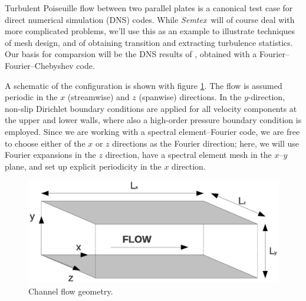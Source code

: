 \documentclass[11pt,a4paper]{report}
\newcommand{\Semtex}{\emph{Semtex}}
\begin{document}
Turbulent Poiseuille flow between two parallel plates is a canonical
test case for direct numerical simulation (DNS) codes.  While
\Semtex\ will of course deal with more complicated problems, we'll use
this as an example to illustrate techniques of mesh design, and of
obtaining transition and extracting turbulence statistics.  Our basis
for comparsion will be the DNS results of \citet*{kmm87}, obtained
with a Fourier--Fourier--Chebyshev code.

A schematic of the configuration is shown with figure
\ref{pic:configuration}. The flow is assumed periodic in the $x$
(streamwise) and $z$ (spanwise) directions.  In the $y$-direction,
non-slip Dirichlet boundary conditions are applied for all velocity
components at the upper and lower walls, where also a high-order
pressure boundary condition \citep[of computed Neumann type,
  see][]{kio91} is employed. Since we are working with a spectral
element--Fourier code, we are free to choose either of the $x$ or $z$
directions as the Fourier direction; here, we will use Fourier
expansions in the $z$ direction, have a spectral element mesh in the
$x$--$y$ plane, and set up explicit periodicity in the $x$ direction.
\begin{figure}[h]
\centering
\includegraphics[width=0.8\linewidth]{dns_config.ps}
\caption{Channel flow geometry.}
\label{pic:configuration}
\end{figure}

\end{document}
